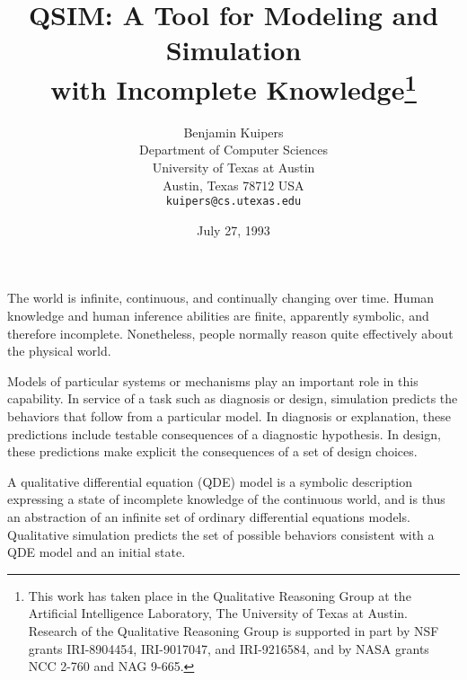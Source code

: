 
\pagestyle{myheadings}
\renewcommand{\baselinestretch}{1}
\setlength{\textwidth}{6in}
\setlength{\topmargin}{0in}
\setlength{\headheight}{.25in}

\newcommand{\Astrom}{\AA{}str\"{o}m}
\newcommand{\Fouche}{Fouch\'{e}}

\title{QSIM: A Tool for Modeling and Simulation \\ with Incomplete
Knowledge\thanks{This work has taken place in the Qualitative
Reasoning Group at the Artificial Intelligence Laboratory, The
University of Texas at Austin.  Research of the Qualitative Reasoning
Group is supported in part by NSF grants IRI-8904454, IRI-9017047, and
IRI-9216584, and by NASA grants NCC 2-760 and NAG 9-665.}}

\author{Benjamin Kuipers \\ Department of Computer Sciences  \\
University of Texas at Austin \\ Austin, Texas 78712 USA  \\
\mbox{\tt kuipers@cs.utexas.edu}}

\date{July 27, 1993}


\maketitle

The world is infinite, continuous, and continually changing over time.
Human knowledge and human inference abilities are finite, apparently
symbolic, and therefore incomplete.  Nonetheless, people normally
reason quite effectively about the physical world.

Models of particular systems or mechanisms play an important role in
this capability.  In service of a task such as diagnosis or design,
simulation predicts the behaviors that follow from a particular model.
In diagnosis or explanation, these predictions include testable
consequences of a diagnostic hypothesis.  In design, these predictions
make explicit the consequences of a set of design choices.

A qualitative differential equation (QDE) model is a symbolic
description expressing a state of incomplete knowledge of the
continuous world, and is thus an abstraction of an infinite set of
ordinary differential equations models.  Qualitative simulation
predicts the set of possible behaviors consistent with a QDE model and
an initial state.

